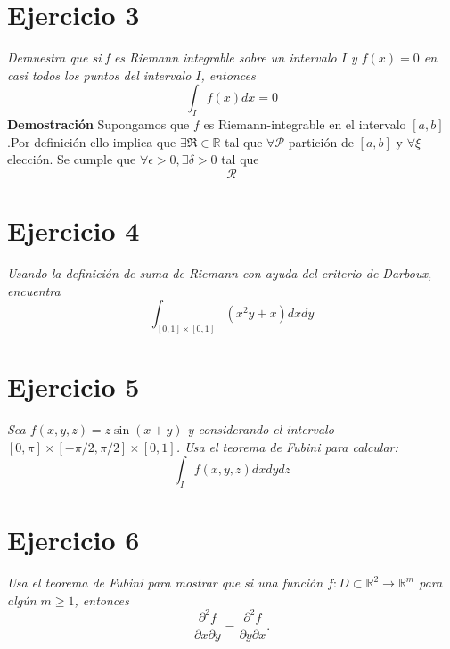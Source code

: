 \documentclass[a4paper,12pt]{article}
\begin{document}
\newpage
\section{Ejercicio 3}
\textit{Demuestra que si f es Riemann integrable sobre un intervalo $I$ y $f (x) = 0$ en casi todos los puntos del intervalo $I$,
entonces}
\[\int_{I} f(x) dx = 0\]
\textbf{Demostración}
Supongamos que $f$ es Riemann-integrable en el intervalo $[a,b]$.Por definición ello implica que $\exists \mathfrak{R} \in \mathbb{R}$
tal que $\forall \mathcal{P} $ partición de $[a,b]$ y $\forall \xi$ elección. Se cumple que $\forall \epsilon > 0, \exists \delta >0$
tal que
\[\mathcal{R}\]



\newpage
\section{Ejercicio 4}
\textit{Usando la definición de suma de Riemann con ayuda del criterio de Darboux, encuentra}
\[\int_{[0,1] \times [0,1]} (x^2y+x)dxdy\]

\newpage
\section{Ejercicio 5}
\textit{Sea $f(x,y,z) = z \sin(x+y)$ y considerando el intervalo $[0,\pi]\times[-\pi/2,\pi/2]\times[0,1]$. Usa el teorema
de Fubini para calcular:}
\[\int_{I} f(x,y,z) dxdydz\]


\newpage
\section{Ejercicio 6}
\textit{Usa el teorema de Fubini para mostrar que si una función $f : D \subset \mathbb{R}^2 \rightarrow \mathbb{R}^m$
para algún $m \geq 1$, entonces}
\[\frac{\partial^2 f}{\partial x \partial y} = \frac{\partial^2 f}{\partial y \partial x}.\]
\end{document}
